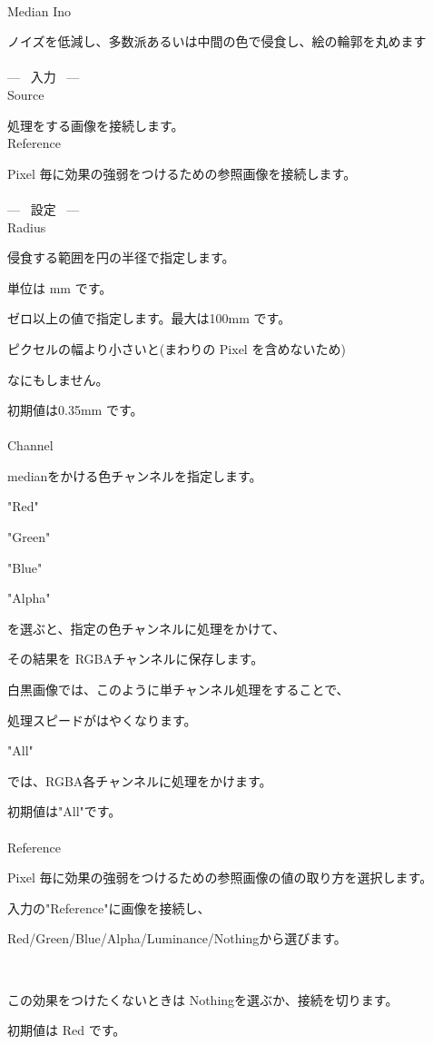 \documentclass[a4paper,12pt]{article}
\begin{document}
\thispagestyle{empty}

\Large
\noindent \\
Median Ino\medskip
\par
\normalsize
ノイズを低減し、多数派あるいは中間の色で侵食し、絵の輪郭を丸めます\\
\\
--- \ 入力 \ ---\\
Source\par
処理をする画像を接続します。\\
Reference\par
Pixel 毎に効果の強弱をつけるための参照画像を接続します。\\
\\
--- \ 設定 \ ---\\
Radius\par
侵食する範囲を円の半径で指定します。\par
単位は mm です。\\
\par
ゼロ以上の値で指定します。最大は100mm です。\par
ピクセルの幅より小さいと(まわりの Pixel を含めないため)\par
なにもしません。\\
\par
初期値は0.35mm です。\\
\\
Channel\par
medianをかける色チャンネルを指定します。\\
\par
"Red"\par
"Green"\par
"Blue"\par
"Alpha"\par
を選ぶと、指定の色チャンネルに処理をかけて、\par
その結果を RGBAチャンネルに保存します。\par
白黒画像では、このように単チャンネル処理をすることで、\par
処理スピードがはやくなります。\\
\par
"All"\par
では、RGBA各チャンネルに処理をかけます。\\
\par
初期値は"All"です。\\
\\
Reference\par
Pixel 毎に効果の強弱をつけるための参照画像の値の取り方を選択します。\par
入力の"Reference"に画像を接続し、\par
Red/Green/Blue/Alpha/Luminance/Nothingから選びます。

\newpage

\thispagestyle{empty}

\ \vspace{-0.2em}
\par
この効果をつけたくないときは Nothingを選ぶか、接続を切ります。\par
初期値は Red です。
\end{document}
